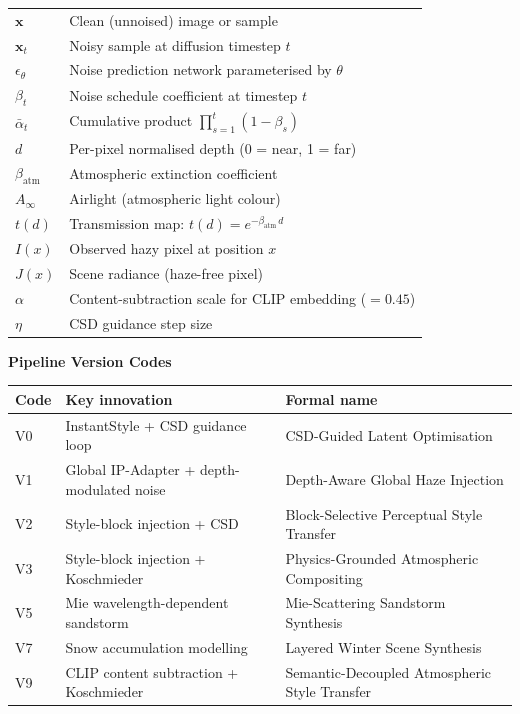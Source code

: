 \bigskip
\begin{tabular}{@{}ll@{}}
$\mathbf{x}$                & Clean (unnoised) image or sample \\
$\mathbf{x}_t$              & Noisy sample at diffusion timestep $t$ \\
$\epsilon_\theta$           & Noise prediction network parameterised by $\theta$ \\
$\beta_t$                   & Noise schedule coefficient at timestep $t$ \\
$\bar{\alpha}_t$            & Cumulative product $\prod_{s=1}^{t}(1-\beta_s)$ \\
$d$                         & Per-pixel normalised depth (0 = near, 1 = far) \\
$\beta_{\mathrm{atm}}$      & Atmospheric extinction coefficient \\
$A_\infty$                  & Airlight (atmospheric light colour) \\
$t(d)$                      & Transmission map: $t(d)=e^{-\beta_{\mathrm{atm}}\,d}$ \\
$I(x)$                      & Observed hazy pixel at position $x$ \\
$J(x)$                      & Scene radiance (haze-free pixel) \\
$\alpha$                    & Content-subtraction scale for CLIP embedding ($=0.45$) \\
$\eta$                      & CSD guidance step size \\
\end{tabular}

\bigskip
\noindent\textbf{Pipeline Version Codes}

\bigskip
\begin{tabularx}{\linewidth}{@{}l>{\raggedright\arraybackslash}X>{\raggedright\arraybackslash}X@{}}
\toprule
\textbf{Code} & \textbf{Key innovation} & \textbf{Formal name} \\
\midrule
V0 & InstantStyle + CSD guidance loop          & CSD-Guided Latent Optimisation \\[2pt]
V1 & Global IP-Adapter + depth-modulated noise & Depth-Aware Global Haze Injection \\[2pt]
V2 & Style-block injection + CSD               & Block-Selective Perceptual Style Transfer \\[2pt]
V3 & Style-block injection + Koschmieder       & Physics-Grounded Atmospheric Compositing \\[2pt]
V5 & Mie wavelength-dependent sandstorm        & Mie-Scattering Sandstorm Synthesis \\[2pt]
V7 & Snow accumulation modelling               & Layered Winter Scene Synthesis \\[2pt]
V9 & CLIP content subtraction + Koschmieder    & Semantic-Decoupled Atmospheric Style Transfer \\
\bottomrule
\end{tabularx}
